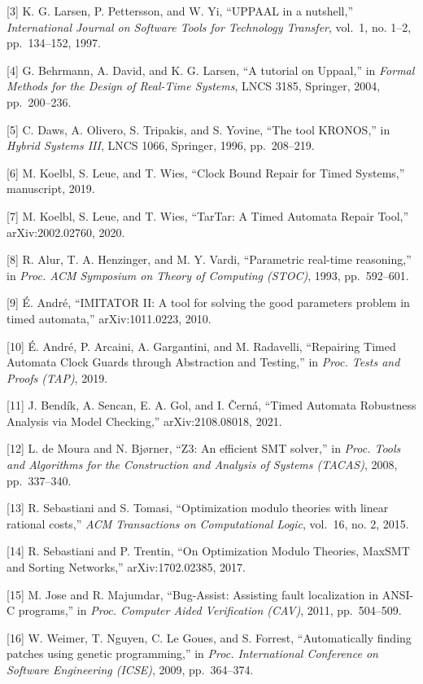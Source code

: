 \documentclass[
]{article}
\begin{document}
{[}3{]} K. G. Larsen, P. Pettersson, and W. Yi, ``UPPAAL in a
nutshell,'' \emph{International Journal on Software Tools for Technology
Transfer}, vol.~1, no. 1--2, pp.~134--152, 1997.

{[}4{]} G. Behrmann, A. David, and K. G. Larsen, ``A tutorial on
Uppaal,'' in \emph{Formal Methods for the Design of Real-Time Systems},
LNCS 3185, Springer, 2004, pp.~200--236.

{[}5{]} C. Daws, A. Olivero, S. Tripakis, and S. Yovine, ``The tool
KRONOS,'' in \emph{Hybrid Systems III}, LNCS 1066, Springer, 1996,
pp.~208--219.

{[}6{]} M. Koelbl, S. Leue, and T. Wies, ``Clock Bound Repair for Timed
Systems,'' manuscript, 2019.

{[}7{]} M. Koelbl, S. Leue, and T. Wies, ``TarTar: A Timed Automata
Repair Tool,'' arXiv:2002.02760, 2020.

{[}8{]} R. Alur, T. A. Henzinger, and M. Y. Vardi, ``Parametric
real-time reasoning,'' in \emph{Proc. ACM Symposium on Theory of
Computing (STOC)}, 1993, pp.~592--601.

{[}9{]} É. André, ``IMITATOR II: A tool for solving the good parameters
problem in timed automata,'' arXiv:1011.0223, 2010.

{[}10{]} É. André, P. Arcaini, A. Gargantini, and M. Radavelli,
``Repairing Timed Automata Clock Guards through Abstraction and
Testing,'' in \emph{Proc. Tests and Proofs (TAP)}, 2019.

{[}11{]} J. Bendík, A. Sencan, E. A. Gol, and I. Černá, ``Timed Automata
Robustness Analysis via Model Checking,'' arXiv:2108.08018, 2021.

{[}12{]} L. de Moura and N. Bjørner, ``Z3: An efficient SMT solver,'' in
\emph{Proc. Tools and Algorithms for the Construction and Analysis of
Systems (TACAS)}, 2008, pp.~337--340.

{[}13{]} R. Sebastiani and S. Tomasi, ``Optimization modulo theories
with linear rational costs,'' \emph{ACM Transactions on Computational
Logic}, vol.~16, no. 2, 2015.

{[}14{]} R. Sebastiani and P. Trentin, ``On Optimization Modulo
Theories, MaxSMT and Sorting Networks,'' arXiv:1702.02385, 2017.

{[}15{]} M. Jose and R. Majumdar, ``Bug-Assist: Assisting fault
localization in ANSI-C programs,'' in \emph{Proc. Computer Aided
Verification (CAV)}, 2011, pp.~504--509.

{[}16{]} W. Weimer, T. Nguyen, C. Le Goues, and S. Forrest,
``Automatically finding patches using genetic programming,'' in
\emph{Proc. International Conference on Software Engineering (ICSE)},
2009, pp.~364--374.
\end{document}
